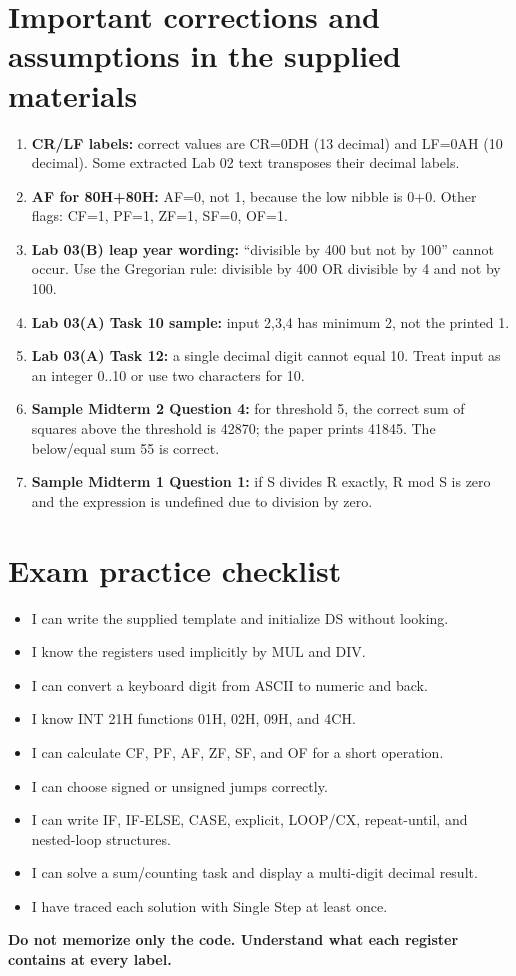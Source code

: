 \documentclass[10pt,a4paper]{article}
\begin{document}
\section{Important corrections and assumptions in the supplied materials}
\begin{enumerate}
\item \textbf{CR/LF labels:} correct values are CR=0DH (13 decimal) and LF=0AH (10 decimal). Some extracted Lab 02 text transposes their decimal labels.
\item \textbf{AF for 80H+80H:} AF=0, not 1, because the low nibble is 0+0. Other flags: CF=1, PF=1, ZF=1, SF=0, OF=1.
\item \textbf{Lab 03(B) leap year wording:} ``divisible by 400 but not by 100'' cannot occur. Use the Gregorian rule: divisible by 400 OR divisible by 4 and not by 100.
\item \textbf{Lab 03(A) Task 10 sample:} input 2,3,4 has minimum 2, not the printed 1.
\item \textbf{Lab 03(A) Task 12:} a single decimal digit cannot equal 10. Treat input as an integer 0..10 or use two characters for 10.
\item \textbf{Sample Midterm 2 Question 4:} for threshold 5, the correct sum of squares above the threshold is 42870; the paper prints 41845. The below/equal sum 55 is correct.
\item \textbf{Sample Midterm 1 Question 1:} if S divides R exactly, R mod S is zero and the expression is undefined due to division by zero.
\end{enumerate}

\section{Exam practice checklist}
\begin{itemize}
\item[\(\square\)] I can write the supplied template and initialize DS without looking.
\item[\(\square\)] I know the registers used implicitly by MUL and DIV.
\item[\(\square\)] I can convert a keyboard digit from ASCII to numeric and back.
\item[\(\square\)] I know INT 21H functions 01H, 02H, 09H, and 4CH.
\item[\(\square\)] I can calculate CF, PF, AF, ZF, SF, and OF for a short operation.
\item[\(\square\)] I can choose signed or unsigned jumps correctly.
\item[\(\square\)] I can write IF, IF-ELSE, CASE, explicit, LOOP/CX, repeat-until, and nested-loop structures.
\item[\(\square\)] I can solve a sum/counting task and display a multi-digit decimal result.
\item[\(\square\)] I have traced each solution with Single Step at least once.
\end{itemize}
\begin{center}\Large\bfseries Do not memorize only the code. Understand what each register contains at every label.\end{center}
\end{document}

